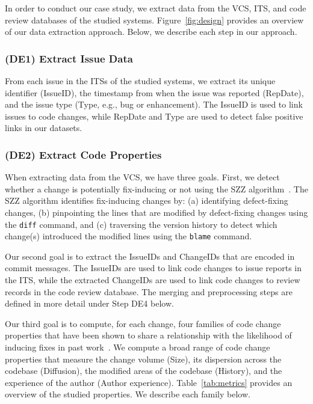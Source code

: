 In order to conduct our case study, we extract data from the VCS, ITS, and code review databases of the studied systems.
Figure~\ref{fig:design} provides an overview of our data extraction approach.
Below, we describe each step in our approach.

\subsubsection*{(DE1) Extract Issue Data}
From each issue in the ITSs of the studied systems, we extract its unique identifier (IssueID), the timestamp from when the issue was reported (RepDate), and the issue type (Type, e.g., bug or enhancement).
The IssueID is used to link issues to code changes, while RepDate and Type are used to detect false positive links in our datasets.

\subsubsection*{(DE2) Extract Code Properties}
When extracting data from the VCS, we have three goals.
First, we detect whether a change is potentially fix-inducing or not using the SZZ algorithm~\cite{sliwerski2005msr}.
The SZZ algorithm identifies fix-inducing changes by:
(a) identifying defect-fixing changes,
(b) pinpointing the lines that are modified by defect-fixing changes using the {\tt diff} command,
and (c) traversing the version history to detect which change(s) introduced the modified lines using the {\tt blame} command.

Our second goal is to extract the IssueIDs and ChangeIDs that are encoded in commit messages.
The IssueIDs are used to link code changes to issue reports in the ITS, while the extracted ChangeIDs are used to link code changes to review records in the code review database.
The merging and preprocessing steps are defined in more detail under Step DE4 below.

Our third goal is to compute, for each change, four families of code change properties that have been shown to share a relationship with the likelihood of inducing fixes in past work~\cite{mockus2000bell, kim2008tse, kamei2013tse, kamei2016emse}.
We compute a broad range of code change properties that measure the change volume (Size), its dispersion across the codebase (Diffusion), the modified areas of the codebase (History), and the experience of the author (Author experience).
Table~\ref{tab:metrics} provides an overview of the studied properties.
We describe each family below.

